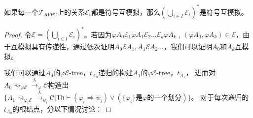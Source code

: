 \begin{lemma}
   如果每一个$\mathcal{T}_{RVPC}$上的关系$\mathcal{E}_i$都是符号互模拟，那么$(\bigcup_{i\in I}\mathcal{E}_i)^*$是符号互模拟。
\end{lemma}
\begin{proof}
   令$\mathcal{E}=(\bigcup_{i\in I}\mathcal{E}_i)^*$。若因为$\varphi A_0\mathcal{E}_1 \varphi A_1 \mathcal{E}_2 \dots \mathcal{E}_k \varphi A_k$ ,
$(\varphi A_0, \varphi A_k)\in \mathcal{E}$，由于互模拟具有传递性，通过依次证明$A_0\mathcal{E}A_1, A_1\mathcal{E}A_2 \dots$，我们可以证明$A_0$和$A_k$互模拟。

我们可以通过$A_0$的$\varphi\mathcal{E}$-tree，$t_{A_0}$递归的构建$A_1$的$\varphi\mathcal{E}$-tree，$t_{A_1}$，
进而对$A_0\rightsquigarrow_{\varphi\mathcal{E}}\stackrel{\lambda}{\rightarrow}_{\varphi}\mathcal{C}$构造出$\{A_1\rightsquigarrow_{\varphi_i\mathcal{E}}\stackrel{\lambda}{\rightarrow}_{\psi_i} \mathcal{C}|\mathsf{Th}\vdash (\varphi_i\Rightarrow\psi_i)\vee (\textrm{$\{\varphi_i\}$是$\varphi$的一个划分})\}$。
对于每次递归的$t_{A_0}$的根结点，分以下情况讨论：


\end{proof}
